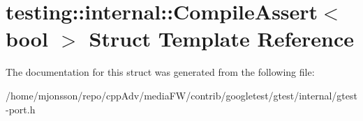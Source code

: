 \hypertarget{structtesting_1_1internal_1_1CompileAssert}{}\section{testing\+:\+:internal\+:\+:Compile\+Assert$<$ bool $>$ Struct Template Reference}
\label{structtesting_1_1internal_1_1CompileAssert}


The documentation for this struct was generated from the following file\+:\begin{DoxyCompactItemize}
\item 
/home/mjonsson/repo/cpp\+Adv/media\+F\+W/contrib/googletest/gtest/internal/gtest-\/port.\+h\end{DoxyCompactItemize}
